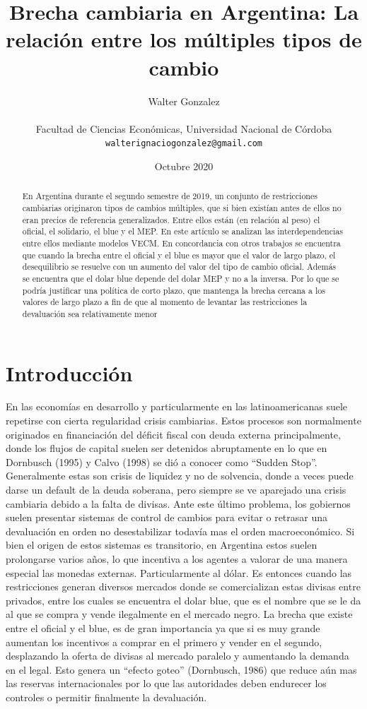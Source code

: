 \documentclass[11pt,a4paper]{article}
\author{Walter Gonzalez\\ \\
\small{Facultad de Ciencias Económicas, Universidad Nacional de Córdoba}\\
\small{\texttt{walterignaciogonzalez@gmail.com}}
}
\title{Brecha cambiaria en Argentina: La relación entre los múltiples tipos de cambio}
\date{Octubre 2020}
\begin{document}
\maketitle
\begin{abstract}
En Argentina durante el segundo semestre de 2019, un conjunto de restricciones cambiarias originaron tipos de cambios múltiples, que si bien existían antes de ellos no eran precios de referencia generalizados. Entre ellos están (en relación al peso) el oficial, el solidario, el blue y el MEP. En este artículo se analizan las interdependencias entre ellos mediante modelos VECM. En concordancia con otros trabajos se encuentra que cuando la brecha entre el oficial y el blue es mayor que el valor de largo plazo, el desequilibrio se resuelve con un aumento del valor del tipo de cambio oficial. Además se encuentra que el dolar blue depende del dolar MEP y no a la inversa. Por lo que se podría justificar una política de corto plazo, que mantenga la brecha cercana a los valores de largo plazo a fin de que al momento de levantar las restricciones la devaluación sea relativamente menor
\end{abstract}

\clearpage


\tableofcontents
\clearpage

\section{Introducción}
En las economías en desarrollo y particularmente en las latinoamericanas suele repetirse con cierta regularidad crisis cambiarias. Estos procesos son normalmente originados en financiación del déficit fiscal con deuda externa principalmente, donde los flujos de capital suelen ser detenidos abruptamente en lo que en Dornbusch (1995) y Calvo (1998) se dió a conocer como ``Sudden Stop''. Generalmente estas son crisis de liquidez y no de solvencia, donde a veces puede darse un default de la deuda soberana, pero siempre se ve aparejado una crisis cambiaria debido a la falta de divisas. Ante este último problema, los gobiernos suelen presentar sistemas de control de cambios para evitar o retrasar una devaluación en orden no desestabilizar todavía mas el orden macroeconómico. Si bien el origen de estos sistemas es transitorio, en Argentina estos suelen prolongarse varios años, lo que incentiva a los agentes a valorar de una manera especial las monedas externas. Particularmente al dólar. Es entonces cuando las restricciones generan diversos mercados donde se comercializan estas divisas entre privados, entre los cuales se encuentra el dolar blue, que es el nombre que se le da al que se compra y vende ilegalmente en el mercado negro. La brecha que existe entre el oficial y el blue, es de gran importancia ya que si es muy grande aumentan los incentivos a comprar en el primero y vender en el segundo, desplazando la oferta de divisas al mercado paralelo y aumentando la demanda en el legal. Esto genera un ``efecto goteo'' (Dornbusch, 1986) que reduce aún mas las reservas internacionales por lo que las autoridades deben endurecer los controles o permitir finalmente la devaluación.
\end{document}
